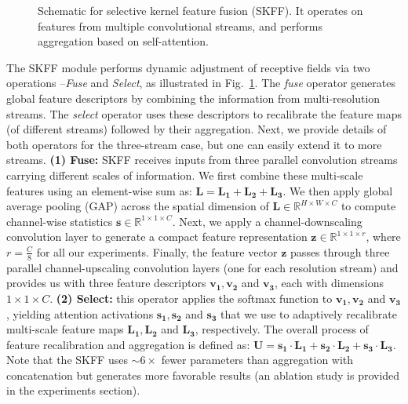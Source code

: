 \documentclass[runningheads]{llncs}
\begin{document}
\begin{figure}[t]
\begin{center}
\end{center}
\vspace*{-6mm}
\caption{\small Schematic for selective kernel feature fusion (SKFF). It operates on features from multiple convolutional streams, and performs aggregation based on self-attention.}
\label{fig:skff}
\vspace*{-2em}
\end{figure}

The SKFF module performs dynamic adjustment of receptive fields via two operations --{\emph{Fuse} and \emph{Select}, as illustrated in Fig.~\ref{fig:skff}}.
The \emph{fuse} operator generates global feature descriptors by combining the information from multi-resolution streams. The \emph{select} operator uses these descriptors to recalibrate the feature maps (of different streams) followed by their aggregation. 
Next, we provide details of both operators for the three-stream case, but one can easily extend it to more streams. 
\textbf{(1) Fuse:} SKFF receives inputs from three parallel convolution streams carrying different scales of information. 
We first combine these multi-scale features using an element-wise sum as: $\mathbf{L = L_1 + L_2 + L_3}$. 
We then apply global average pooling (GAP) across the spatial dimension of $\mathbf{L} \in \mathbb{R}^{H\times W \times C}$ to compute channel-wise statistics $\mathbf{s} \in \mathbb{R}^{1\times 1 \times C}$. 
Next, we apply a channel-downscaling convolution layer to generate a compact feature representation $\mathbf{z} \in \mathbb{R}^{1\times 1 \times r}$, where $r=\frac{C}{8}$ for all our experiments.
Finally, the feature vector $\mathbf{z}$ passes through three parallel channel-upscaling convolution layers (one for each resolution stream) and provides us with three feature descriptors $\mathbf{v_1}, \mathbf{v_2}$ and $\mathbf{v_3}$, each with dimensions $1\times1\times C$. 
\textbf{(2) Select:} this operator applies the softmax function to $\mathbf{v_1}, \mathbf{v_2}$ and $\mathbf{v_3}$, yielding attention activations $\mathbf{s_1}, \mathbf{s_2}$ and $\mathbf{s_3}$ that we use to adaptively recalibrate multi-scale feature maps $\mathbf{L_1}, \mathbf{L_2}$ and $\mathbf{L_3}$, respectively. The overall process of feature recalibration and aggregation is defined as: $\mathbf{U = s_1 \cdot L_1 + s_2\cdot L_2 + s_3 \cdot L_3}$. 
Note that the SKFF uses $\sim6\times$ fewer parameters than aggregation with concatenation but generates more favorable results (an ablation study is provided in the experiments section). 
\end{document}
